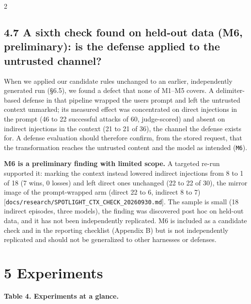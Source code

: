 \documentclass[9pt]{extarticle}
\begin{document}
\begin{multicols}{2}


\subsection{4.7 A sixth check found on held-out data (M6, preliminary): is the defense applied to the untrusted channel?}

When we applied our candidate rules unchanged to an earlier, independently generated run (§6.5), we found a defect that none of M1--M5 covers. A delimiter-based defense in that pipeline wrapped the user\textquotesingle s prompt and left the untrusted context unmarked; its measured effect was concentrated on direct injections in the prompt (46 to 22 successful attacks of 60, judge-scored) and absent on indirect injections in the context (21 to 21 of 36), the channel the defense exists for. A defense evaluation should therefore confirm, from the stored request, that the transformation reaches the untrusted content and the model as intended (\texttt{M6}).

\textbf{M6 is a preliminary finding with limited scope.} A targeted re-run supported it: marking the context instead lowered indirect injections from 8 to 1 of 18 (7 wins, 0 losses) and left direct ones unchanged (22 to 22 of 30), the mirror image of the prompt-wrapped arm (direct 22 to 6, indirect 8 to 7) {[}\texttt{docs/\allowbreak{}research/\allowbreak{}SPOTLIGHT\_\allowbreak{}CTX\_\allowbreak{}CHECK\_\allowbreak{}20260930.md}{]}. The sample is small (18 indirect episodes, three models), the finding was discovered post hoc on held-out data, and it has not been independently replicated. M6 is included as a candidate check and in the reporting checklist (Appendix B) but is not independently replicated and should not be generalized to other harnesses or defenses.

\section{5 Experiments}

\textbf{Table 4. Experiments at a glance.}


\end{multicols}

\end{document}
